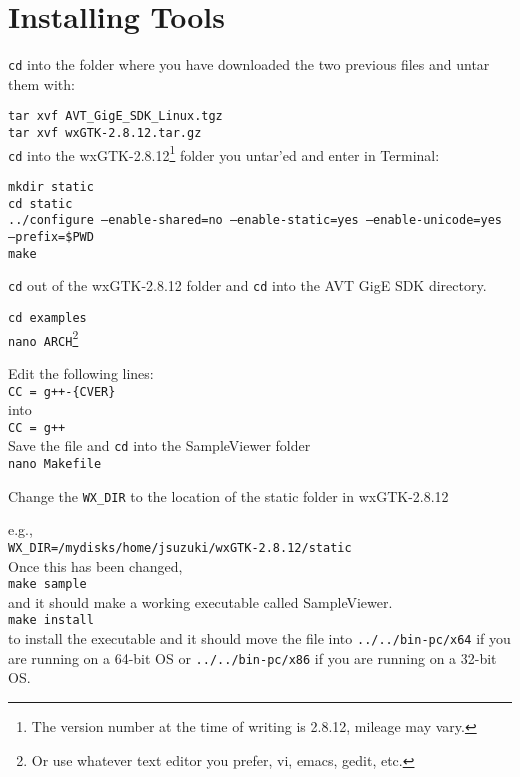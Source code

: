\documentclass[10pt]{scrartcl}
\begin{document}
\section{Installing Tools}

\texttt{cd} into the folder where you have downloaded the two previous files and untar them with:

\texttt{tar xvf AVT\_GigE\_SDK\_Linux.tgz\\
tar xvf wxGTK-2.8.12.tar.gz}\\


\texttt{cd} into the wxGTK-2.8.12\footnote{The version number at the time of writing is 2.8.12, mileage may vary.} folder you untar'ed and enter in Terminal:

\texttt{mkdir static \\
cd static \\
../configure --enable-shared=no --enable-static=yes --enable-unicode=yes --prefix=\$PWD\\
make
}

\texttt{cd} out of the wxGTK-2.8.12 folder and \texttt{cd} into the AVT GigE SDK directory.

\texttt{cd examples\\
nano ARCH}\footnote{Or use whatever text editor you prefer, vi, emacs, gedit, etc.}\\

\newpage

Edit the following lines:\\
\texttt{CC = g++-\{CVER\}}\\
into\\
\texttt{CC = g++}\\

Save the file and \texttt{cd} into the SampleViewer folder\\
\texttt{nano Makefile}

Change the \texttt{WX\_DIR} to the location of the static folder in wxGTK-2.8.12

e.g.,\\
\texttt{WX\_DIR=/mydisks/home/jsuzuki/wxGTK-2.8.12/static}\\

Once this has been changed,\\
\texttt{make sample}\\
and it should make a working executable called SampleViewer.\\
\texttt{make install}\\
to install the executable and it should move the file into \texttt{../../bin-pc/x64} if you are running on a 64-bit OS or  \texttt{../../bin-pc/x86} if you are running on a 32-bit OS.
\end{document}
